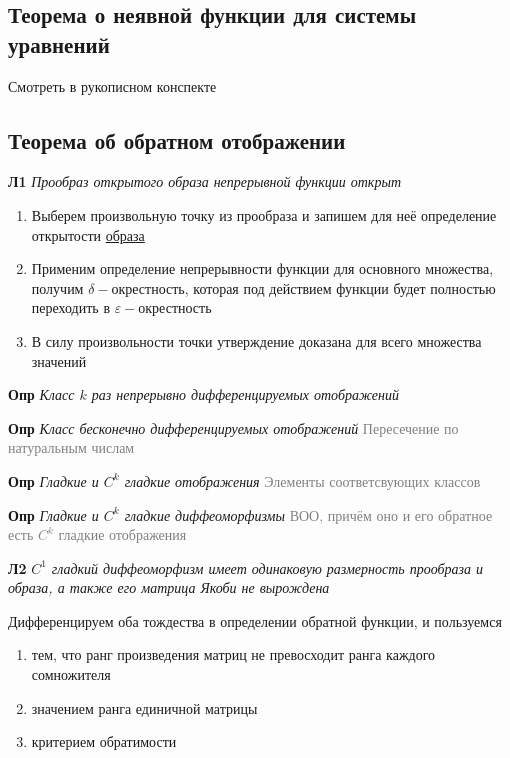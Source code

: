 \subsection{Теорема о неявной функции для системы уравнений}

Смотреть в рукописном конспекте

\subsection{Теорема об обратном отображении}

\textbf{Л1} \textit{Прообраз открытого образа непрерывной функции открыт}

\begin{enumerate}
    \item Выберем произвольную точку из прообраза и запишем для неё определение открытости \underline{образа}
    \item Применим определение непрерывности функции для основного множества, получим $\delta-$окрестность,
    которая под действием функции будет полностью переходить в $\varepsilon-$окрестность
    \item В силу произвольности точки утверждение доказана для всего множества значений
\end{enumerate}

\textbf{Опр} \textit{Класс $k$ раз непрерывно дифференцируемых отображений}

\textbf{Опр} \textit{Класс бесконечно дифференцируемых отображений}
\textcolor{gray}{Пересечение по натуральным числам}

\textbf{Опр} \textit{Гладкие и $C^k$ гладкие отображения} \textcolor{gray}{Элементы соответсвующих классов}

\textbf{Опр} \textit{Гладкие и $C^k$ гладкие диффеоморфизмы}
\textcolor{gray}{ВОО, причём оно и его обратное есть $C^k$ гладкие отображения}

\textbf{Л2}
\textit{$C^1$ гладкий диффеоморфизм имеет одинаковую размерность прообраза и образа, а также его матрица Якоби не
вырождена}

Дифференцируем оба тождества в определении обратной функции, и пользуемся
\begin{enumerate}
    \item тем, что ранг произведения матриц не превосходит ранга каждого сомножителя
    \item значением ранга единичной матрицы
    \item критерием обратимости
\end{enumerate}

